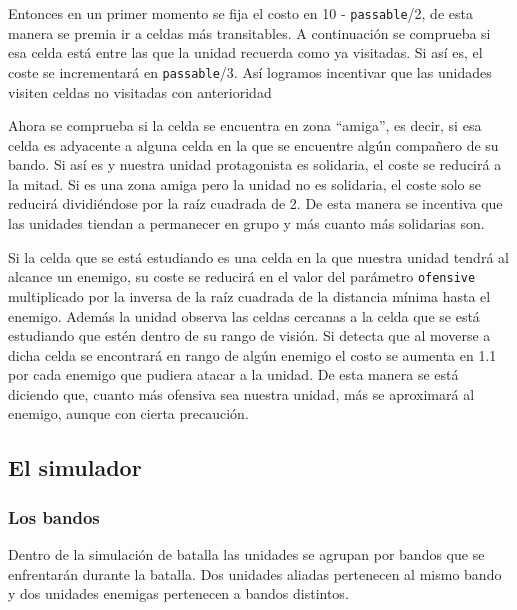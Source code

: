 Entonces en un primer momento se fija el costo en 10 - \verb|passable|/2, de esta manera se premia ir a celdas más transitables. A continuación se comprueba si esa celda está entre las que la unidad recuerda como ya visitadas. Si así es, el coste se incrementará en \verb|passable|/3. Así logramos incentivar que las unidades visiten celdas no visitadas con anterioridad  
  
Ahora se comprueba si la celda se encuentra en zona ``amiga'', es decir, si esa celda es adyacente a alguna celda en la que se encuentre algún compañero de su bando. Si así es y nuestra unidad protagonista es solidaria, el coste se reducirá a la mitad. Si es una zona amiga pero la unidad no es solidaria, el coste solo se reducirá dividiéndose por la raíz cuadrada de 2. De esta manera se incentiva que las unidades tiendan a permanecer en grupo y más cuanto más solidarias son.

Si la celda que se est\'a estudiando es una celda en la que nuestra unidad tendr\'a al alcance un enemigo, su coste se reducir\'a en el valor del par\'ametro \verb|ofensive|  multiplicado por la inversa de la ra\'iz cuadrada de la distancia m\'inima hasta el enemigo. Adem\'as la unidad observa las celdas cercanas a la celda que se est\'a estudiando que est\'en dentro de su rango de visi\'on. Si detecta que al moverse a dicha celda se encontrar\'a en rango de alg\'un enemigo el costo se aumenta en 1.1 por cada enemigo que pudiera atacar a la unidad. De esta manera se est\'a diciendo que, cuanto m\'as ofensiva sea nuestra unidad, m\'as se aproximar\'a al enemigo, aunque con cierta precauci\'on.  

\subsection{El simulador}

\subsubsection{Los bandos}

Dentro de la simulaci\'on de batalla las  unidades se agrupan por bandos que se enfrentar\'an durante la batalla. Dos unidades aliadas pertenecen al mismo bando y dos unidades enemigas pertenecen a bandos distintos.

